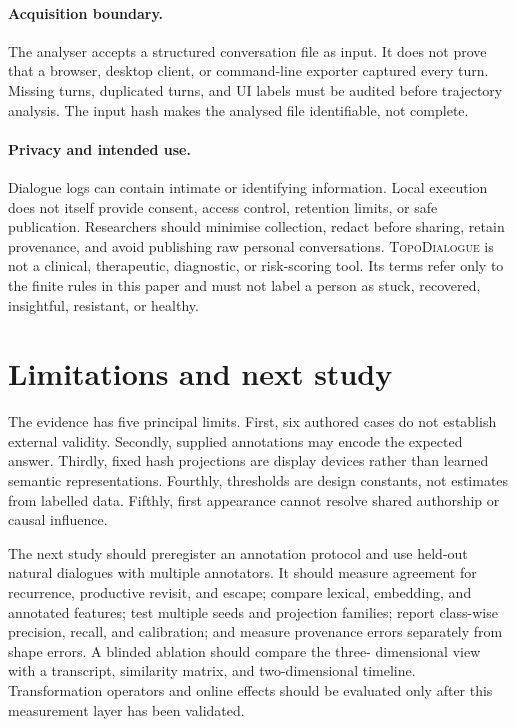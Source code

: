 \documentclass[11pt]{article}
\newcommand{\system}{\textsc{TopoDialogue}}
\begin{document}
\paragraph{Acquisition boundary.}
The analyser accepts a structured conversation file as input. It does not prove
that a browser, desktop client, or command-line exporter captured every turn.
Missing turns, duplicated turns, and UI labels must be audited before trajectory
analysis. The input hash makes the analysed file identifiable, not complete.

\paragraph{Privacy and intended use.}
Dialogue logs can contain intimate or identifying information. Local execution
does not itself provide consent, access control, retention limits, or safe
publication. Researchers should minimise collection, redact before sharing,
retain provenance, and avoid publishing raw personal conversations. \system{}
is not a clinical, therapeutic, diagnostic, or risk-scoring tool. Its terms
refer only to the finite rules in this paper and must not label a person as
stuck, recovered, insightful, resistant, or healthy.

\section{Limitations and next study}

The evidence has five principal limits. First, six authored cases do not
establish external validity. Secondly, supplied annotations may encode the
expected answer. Thirdly, fixed hash projections are display devices rather
than learned semantic representations. Fourthly, thresholds are design
constants, not estimates from labelled data. Fifthly, first appearance cannot
resolve shared authorship or causal influence.

The next study should preregister an annotation protocol and use held-out
natural dialogues with multiple annotators. It should measure agreement for
recurrence, productive revisit, and escape; compare lexical, embedding, and
annotated features; test multiple seeds and projection families; report
class-wise precision, recall, and calibration; and measure provenance errors
separately from shape errors. A blinded ablation should compare the three-
dimensional view with a transcript, similarity matrix, and two-dimensional
timeline. Transformation operators and online effects should be evaluated only
after this measurement layer has been validated.
\end{document}
